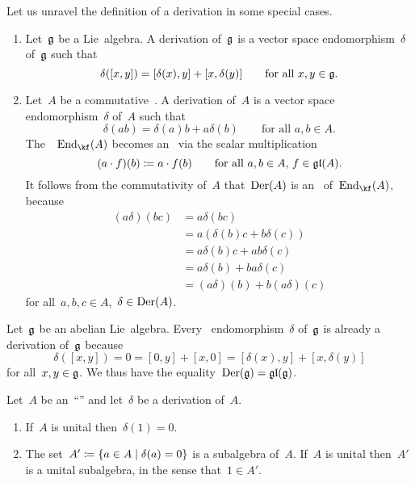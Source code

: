 \begin{remark}
  \label{derivations made explicit}
  Let us unravel the definition of a derivation in some special cases.
  \begin{enumerate}
    \item
      Let~$\mathfrak{g}$ be a Lie~algebra.
      A derivation of~$\mathfrak{g}$ is a vector space endomorphism~$\delta$ of~$\mathfrak{g}$ such that
      \[
        \delta([x,y])
        =
        [\delta(x), y] + [x, \delta(y)]
        \qquad
        \text{for all~$x, y \in \mathfrak{g}$.}
      \]
    \item
      Let~$A$ be a commutative~\algebra{$\kf$}.
      A derivation of~$A$ is a vector space endomorphism~$\delta$ of~$A$ such that
      \[
        \delta(ab)
        =
        \delta(a) b + a \delta(b)
        \qquad
        \text{for all~$a, b \in A$}.
      \]
      The~\vectorspace{$\kf$}~$\End_{\kf}(A)$ becomes an~ via the scalar multiplication
      \[
        (a \cdot f)(b)
        \coloneqq
        a \cdot f(b)
        \qquad
        \text{for all~$a, b \in A$,~$f \in \mathfrak{gl}(A)$.}
      \]
      It follows from the commutativity of~$A$ that~$\operatorname{Der}(A)$ is an~ of~$\End_{\kf}(A)$, because
      \begin{align*}
        (a \delta)(b c)
        &=
        a \delta(b c)
        \\
        &=
        a ( \delta(b) c + b \delta(c) )
        \\
        &=
        a \delta(b) c + a b \delta(c)
        \\
        &=
        a \delta(b) + b a \delta(c)
        \\
        &=
        (a \delta)(b) + b (a \delta)(c)
      \end{align*}
      for all~$a, b, c \in A$,~$\delta \in \operatorname{Der}(A)$.
  \end{enumerate}
\end{remark}


\begin{example}
  Let~$\mathfrak{g}$ be an abelian Lie~algebra.
  Every~\linear{$\kf$} endomorphism~$\delta$ of~$\mathfrak{g}$ is already a derivation of~$\mathfrak{g}$ because
  \[
    \delta([x,y])
    =
    0
    =
    [0, y] + [x, 0]
    =
    [\delta(x), y] + [x, \delta(y)]
  \]
  for all~$x, y \in \mathfrak{g}$.
  We thus have the equality~$\operatorname{Der}(\mathfrak{g}) = \mathfrak{gl}(\mathfrak{g})$.
\end{example}


\begin{lemma}
  \label{about the kernel of a derivation}
  Let~$A$ be an~\enquote{\algebra{$\kf$}} and let~$\delta$ be a derivation of~$A$.
  \begin{enumerate}
    \item
      If~$A$ is unital then~$\delta(1) = 0$.
    \item
      The set~$A' \defined \{ a \in A \suchthat \delta(a) = 0 \}$ is a subalgebra of~$A$.
      If~$A$ is unital then~$A'$ is a unital subalgebra, in the sense that~$1 \in A'$.
  \end{enumerate}
\end{lemma}


